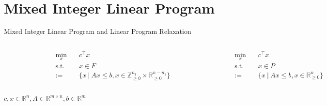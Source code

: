 \section{Mixed Integer Linear Program}

\begin{frame}{Mixed Integer Linear Program and Linear Program Relaxation}
\small
\begin{columns}

	\begin{figure}
	\centering
	
	\end{figure}
	
	\begin{tcolorbox}[colback=white, title={MILP (standard form)}]
    \begin{align*}
    	\min_{x}\quad &c^\top x \\
    	\text{s.t.}\quad & x\in F \\
    	:= &\{x \:\vert\: Ax \leq b, x \in \mathbb{Z}_{\geq 0}^{n_1} \times \mathbb{R}_{\geq 0}^{n-n_1} \}
    \end{align*}
    \end{tcolorbox}

	\begin{figure}
	\centering
	
	\end{figure}
	
	\begin{tcolorbox}[colback=white, title={LP Relaxation}]
    \begin{align*}
    	\min_{x}\quad &c^\top x \\
    	\text{s.t.}\quad &x \in P\\
    	:= &\{x \:\vert\: Ax \leq b, x \in \mathbb{R}_{\geq 0}^{n}\}
    \end{align*}
    \end{tcolorbox}
\end{columns}
$c,x \in \mathbb{R}^n, A \in \mathbb{R}^{m \times n}, b \in \mathbb{R}^m$
\end{frame}



